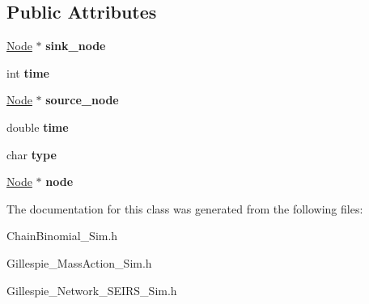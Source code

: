 \subsection*{Public Attributes}
\begin{DoxyCompactItemize}
\item 
\hypertarget{classEvent_a3fe803b2b6c7bd89e27da7bb9780654a}{}\hyperlink{classNode}{Node} $\ast$ {\bfseries sink\+\_\+node}\label{classEvent_a3fe803b2b6c7bd89e27da7bb9780654a}

\item 
\hypertarget{classEvent_a7cf2572f1124c9700c89ff9f01b311bf}{}int {\bfseries time}\label{classEvent_a7cf2572f1124c9700c89ff9f01b311bf}

\item 
\hypertarget{classEvent_ad2be4bbe5fd7ea71576221bd21be6de0}{}\hyperlink{classNode}{Node} $\ast$ {\bfseries source\+\_\+node}\label{classEvent_ad2be4bbe5fd7ea71576221bd21be6de0}

\item 
\hypertarget{classEvent_a7cf2572f1124c9700c89ff9f01b311bf}{}double {\bfseries time}\label{classEvent_a7cf2572f1124c9700c89ff9f01b311bf}

\item 
\hypertarget{classEvent_a9bfb5a7398950cf1477e2dd365c93383}{}char {\bfseries type}\label{classEvent_a9bfb5a7398950cf1477e2dd365c93383}

\item 
\hypertarget{classEvent_abe1fedc4d0a92195dc9184183c99477a}{}\hyperlink{classNode}{Node} $\ast$ {\bfseries node}\label{classEvent_abe1fedc4d0a92195dc9184183c99477a}

\end{DoxyCompactItemize}


The documentation for this class was generated from the following files\+:\begin{DoxyCompactItemize}
\item 
Chain\+Binomial\+\_\+\+Sim.\+h\item 
Gillespie\+\_\+\+Mass\+Action\+\_\+\+Sim.\+h\item 
Gillespie\+\_\+\+Network\+\_\+\+S\+E\+I\+R\+S\+\_\+\+Sim.\+h\end{DoxyCompactItemize}
